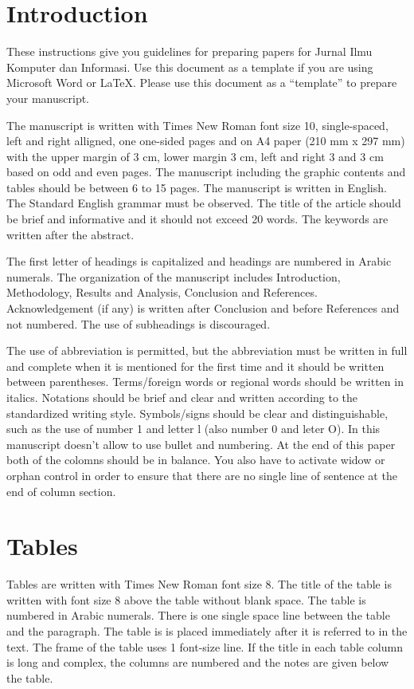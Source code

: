 \documentclass[conference, compsoc, twoside]{IEEEtran}
\begin{document}
\section{Introduction}
These instructions give you guidelines for preparing papers for Jurnal Ilmu Komputer dan Informasi. Use this document as a template if you are using Microsoft Word or \LaTeX. Please use this document as a “template” to prepare your manuscript.

The manuscript is written with Times New Roman font size 10, single-spaced, left and right alligned, one one-sided pages and on A4 paper (210 mm x 297 mm) with the upper margin of 3 cm, lower margin 3 cm, left and right 3 and 3 cm based on odd and even pages. The manuscript including the graphic contents and tables should be between 6 to 15 pages. The manuscript is written in English. The Standard English grammar must be observed. The title of the article should be brief and informative and it should not exceed 20 words. The keywords are written after the abstract.

The first letter of headings is capitalized and headings are numbered in Arabic numerals. The organization of the manuscript includes Introduction, Methodology, Results and Analysis, Conclusion and References. Acknowledgement (if any) is written after Conclusion and before References and not numbered. The use of subheadings is discouraged. 

The use of abbreviation is permitted, but the abbreviation must be written in full and complete when it is mentioned for the first time and it should be written between parentheses. Terms/foreign words or regional words should be written in italics. Notations should be brief and clear and written according to the standardized writing style. Symbols/signs should be clear and distinguishable, such as the use of number 1 and letter l (also number 0 and leter O). In this manuscript doesn’t allow to use bullet and numbering. At the end of this paper both of the colomns should be in balance. You also have to activate widow or orphan control in order to ensure that there are no single line of sentence at the end of column section.     

\section{Tables}
Tables are written with Times New Roman font size 8. The title of the table is written with font size 8 above the table without blank space. The table is numbered in Arabic numerals. There is one single space line between the table and the paragraph. The table is is placed immediately after it is referred to in the text. The frame of the table uses 1 font-size line. If the title in each table column is long and complex, the columns are numbered and the notes are given below the table.
\end{document}
